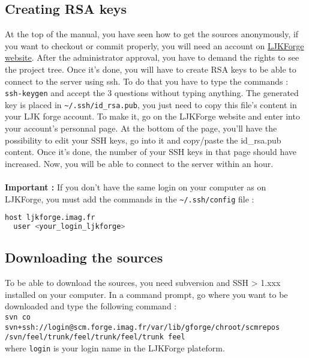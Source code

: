 \subsection{Creating RSA keys}
\label{sec:creation-rsa-keys}
At the top of the manual, you have seen how to get the sources anonymously, if you want to checkout or commit properly, you will need an account on \href{https://forge.imag.fr/}{LJKForge website}. After the administrator approval, you have to demand the rights to see the project tree. \newline \newline
Once it's done, you will have to create RSA keys to be able to connect to the server using ssh. To do that you have to type the commands : \verb|ssh-keygen| and accept the 3 questions without typing anything. The generated key is placed in \verb|~/.ssh/id_rsa.pub|, you just need to copy this file's content in your LJK forge account. To make it, go on the LJKForge website and enter into your account's personnal page. At the bottom of the page, you'll have the possibility to edit your SSH keys, go into it and copy/paste the id\_rsa.pub content. Once it's done, the number of your SSH keys in that page should have increased. Now, you will be able to connect to the server within an hour.
\\ \\
{\bfseries Important : } If you don't have the same login on your computer as on
LJKForge, you must add the commands in the \verb|~/.ssh/config| file :
\begin{lstlisting}[language=sh]
host ljkforge.imag.fr
  user <your_login_ljkforge>
\end{lstlisting}


\subsection{Downloading the sources}
\label{sec:download-sources}

To be able to download the \feel sources, you need subversion and SSH > 1.xxx
installed on your computer. In a command prompt, go where you want \feel to be
downloaded and type the following command :
\\ \verb|svn co svn+ssh://login@scm.forge.imag.fr/var/lib/gforge/chroot/scmrepos|
\\ \verb|/svn/feel/trunk/feel/trunk/feel/trunk feel|
\\ where \verb|login| is your login name in the LJKForge plateform.

